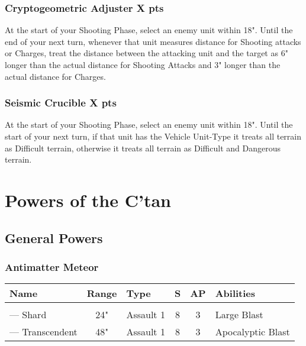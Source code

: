 \subsubsection[Cryptogeometric Adjuster ]{Cryptogeometric Adjuster  \hrulefill X pts}

At the start of your Shooting Phase, select an enemy unit within 18". Until the end of your next turn, whenever that unit measures distance for Shooting attacks or Charges, treat the distance between the attacking unit and the target as 6" longer than the actual distance for Shooting Attacks and 3" longer than the actual distance for Charges.


\subsubsection[Seismic Crucible]{Seismic Crucible \hrulefill X pts}

At the start of your Shooting Phase, select an enemy unit within 18". Until the start of your next turn, if that unit has the Vehicle Unit-Type it treats all terrain as Difficult terrain, otherwise it treats all terrain as Difficult and Dangerous terrain.


\section{Powers of the C'tan} \label{Powers of the C'tan}

\subsection{General Powers}

\subsubsection{Antimatter Meteor} \label{Antimatter Meteor}

\noindent
\begin{NiceTabular}{L{115 pt} c C{40pt} *{2}{c} >{\raggedright\arraybackslash}p{240pt}}
	Name & Range & Type & S & AP & Abilities \\
	\hline
	 &  &  &  &  & \\
	— Shard & 24" & Assault 1 & 8 & 3 & Large Blast \\
	 — Transcendent & 48" & Assault 1 & 8 & 3 & Apocalyptic Blast \\
\end{NiceTabular}

